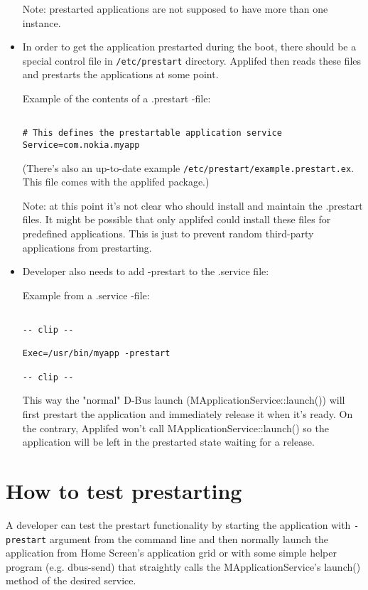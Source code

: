\documentclass[a4paper]{article}
\begin{document}
\begin{itemize}
Note: prestarted applications are not supposed to have more than one instance.

\item In order to get the application prestarted during the boot, there should be a special
control file in \texttt{/etc/prestart} directory. Applifed then reads these files and
prestarts the applications at some point. 

Example of the contents of a .prestart -file:

\begin{verbatim}

# This defines the prestartable application service
Service=com.nokia.myapp

\end{verbatim}

(There's also an up-to-date example \texttt{/etc/prestart/example.prestart.ex}. This file comes
with the applifed package.)

Note: at this point it's not clear who should install and maintain the .prestart files. It might be
possible that only applifed could install these files for predefined applications. This is just
to prevent random third-party applications from prestarting.

\item Developer also needs to add -prestart to the .service file:

Example from a .service -file:

\begin{verbatim}

-- clip --

Exec=/usr/bin/myapp -prestart

-- clip --

\end{verbatim}

This way the "normal" D-Bus launch (MApplicationService::launch()) will first prestart the application and 
immediately release it when it's ready. On the contrary, Applifed won't call MApplicationService::launch() 
so the application will be left in the prestarted state waiting for a release.

\end{itemize}

\section{How to test prestarting}

A developer can test the prestart functionality by starting the application with \texttt{-prestart} argument from the command line and then normally launch the application from Home Screen's application grid or with some simple helper program (e.g. dbus-send) that straightly calls the MApplicationService's launch() method of the desired service.
\end{document}
